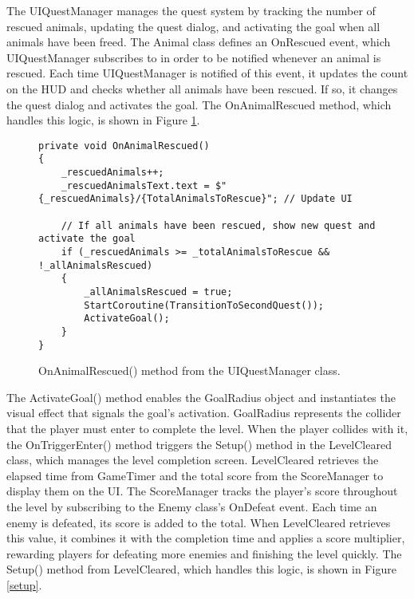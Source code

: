 \documentclass[10pt]{final_report}
\begin{document}
The UIQuestManager manages the quest system by tracking the number of rescued animals, updating the quest dialog, and activating the goal when all animals have been freed. The Animal class defines an OnRescued event, which UIQuestManager subscribes to in order to be notified whenever an animal is rescued. Each time UIQuestManager is notified of this event, it updates the count on the HUD and checks whether all animals have been rescued. If so, it changes the quest dialog and activates the goal. The OnAnimalRescued method, which handles this logic, is shown in Figure \ref{onanimalrescued}.
\begin{figure}[H]
\begin{verbatim}
private void OnAnimalRescued()
{
    _rescuedAnimals++;
    _rescuedAnimalsText.text = $"{_rescuedAnimals}/{TotalAnimalsToRescue}"; // Update UI

    // If all animals have been rescued, show new quest and activate the goal
    if (_rescuedAnimals >= _totalAnimalsToRescue && !_allAnimalsRescued)
    {
        _allAnimalsRescued = true;
        StartCoroutine(TransitionToSecondQuest());
        ActivateGoal();
    }
}
\end{verbatim}
\caption{OnAnimalRescued() method from the UIQuestManager class.}
\label{onanimalrescued}
\end{figure}
The ActivateGoal() method enables the GoalRadius object and instantiates the visual effect that signals the goal’s activation. GoalRadius represents the collider that the player must enter to complete the level. When the player collides with it, the OnTriggerEnter() method triggers the Setup() method in the LevelCleared class, which manages the level completion screen.
LevelCleared retrieves the elapsed time from GameTimer and the total score from the ScoreManager to display them on the UI. The ScoreManager tracks the player’s score throughout the level by subscribing to the Enemy class's OnDefeat event. Each time an enemy is defeated, its score is added to the total. When LevelCleared retrieves this value, it combines it with the completion time and applies a score multiplier, rewarding players for defeating more enemies and finishing the level quickly. The Setup() method from LevelCleared, which handles this logic, is shown in Figure \ref{setup}.
\end{document}
